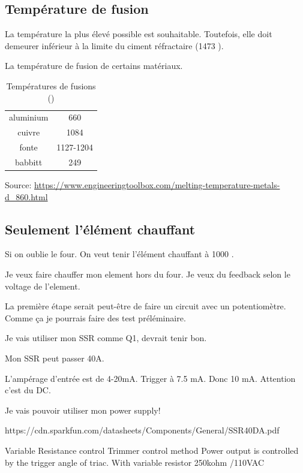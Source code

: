 \documentclass{article}
\begin{document}
\subsection{Température de fusion}

La température la plus élevé possible est souhaitable. Toutefois, elle doit demeurer inférieur à la limite du ciment réfractaire (1473 \celsius).

La température de fusion de certains matériaux.

\begin{table}[ht]
    \caption{Températures de fusions (\celsius)}
    \centering
    
    \begin{tabular}{|c|c|}
        \hline
        aluminium & 660 \\
        cuivre & 1084 \\
        fonte & 1127-1204 \\
        babbitt & 249 \\ 
        \hline
    \end{tabular}
    \label{tab:point_fusions}
\end{table}
Source: \url{https://www.engineeringtoolbox.com/melting-temperature-metals-d_860.html}

\subsection{Seulement l'élément chauffant}

Si on oublie le four. On veut tenir l'élément chauffant à 1000 \celsius.

Je veux faire chauffer mon element hors du four. Je veux du feedback selon le voltage de l'element.

La première étape serait peut-être de faire un circuit avec un potentiomètre. Comme ça je pourrais faire des test préléminaire.

Je vais utiliser mon SSR comme Q1, devrait tenir bon.

Mon SSR peut passer 40A.

L'ampérage d'entrée est de 4-20mA. Trigger à 7.5 mA. Donc 10 mA. Attention c'est du DC.

Je vais pouvoir utiliser mon power supply!

https://cdn.sparkfun.com/datasheets/Components/General/SSR40DA.pdf

Variable Resistance control
Trimmer control method
Power output is controlled by the trigger angle of triac. With variable resistor 250kohm /110VAC
\end{document}
